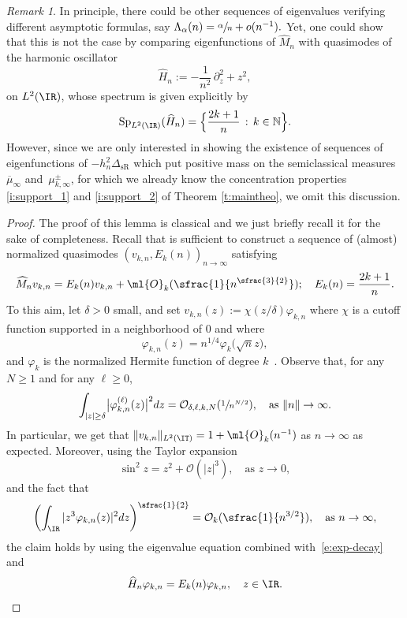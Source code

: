 \documentclass[JEP,XML,SOM,Unicode, NoEqCountersInSection,published]{cedram}
\theoremstyle{plain}
\theoremstyle{definition}
\theoremstyle{remark}
\newtheorem{rema}[theo]{Remark}
\begin{document}
\begin{rema} In principle, there could be other sequences of eigenvalues verifying different asymptotic formulas, say $\Lambda_\alpha(n)=\sfrac{\alpha}{n}+o(n^{-1}).$ Yet, one could show that this is not the case by comparing eigenfunctions of $\widehat{M}_n$ with quasimodes of the harmonic oscillator
\begin{equation}
\widehat{H}_n := - \frac{1}{ n^2}\, \partial_z^2 + z^2,
\end{equation}
on $L^2(\IR)$, whose spectrum is given explicitly by
\[
\operatorname{Sp}_{L^2(\IR)}(\widehat{H}_n) = \Bigl \{ \frac{2k+1}{n } \, : \, k \in \mathbb{N} \Bigr \}.
\]
However, since we are only interested in showing the existence of sequences of eigenfunctions of $-h_n^2 \Delta_{\operatorname{sR}}$ which put positive mass on the semiclassical measures $\overline{\mu}_\infty$ and~$\mu_{k,\infty}^\pm$, for which we already know the concentration properties \eqref{i:support_1} and \eqref{i:support_2} of Theorem \ref{t:maintheo}, we omit this discussion.
\end{rema}

\begin{proof}
The proof of this lemma is classical and we just briefly recall it for the sake of completeness. Recall that is sufficient to construct a sequence of (almost) normalized quasimodes $(v_{k,n}, E_k(n))_{n\to \infty}$ satisfying
\[
\widehat{M}_n v_{k,n} = E_k(n) v_{k,n} + \ml{O}_k(\sfrac{1}{n^{\sfrac{3}{2}}}); \quad E_k(n) = \frac{2k+1}{ n}.
\]
To this aim, let $\delta > 0$ small, and set $v_{k,n}(z) := \chi(z/\delta)\varphi_{k,n}$ where $\chi$ is a cutoff function supported in a neighborhood of $0$ and where
\[
\varphi_{k,n}(z) = n^{1/4} \varphi_k\big(\sqrt{n}z \big),
\]
and $\varphi_k$ is the normalized Hermite function of degree $k$~\cite[Th.\,6.2]{Zworski12}. Observe that, for any $N \geq 1$ and for any $\ell\geq 0$,
\begin{equation}\label{e:exp-decay}
\int_{|z|\geq \delta}\bigl|\varphi_{k,n}^{(\ell)}(z)\bigr|^2dz = \mathcal{O}_{\delta,\ell,k,N}(\sfrac{1}{ n^{N/2}}), \quad \text{as } \|n\| \to \infty.
\end{equation}
In particular, we get that $\|v_{k,n}\|_{L^2(\IT)}=1+\ml{O}_k(n^{-1})$ as $n\to\infty$ as expected. Moreover, using the Taylor expansion
\[
\sin^2z = z^2 + \mathcal{O}(\vert z \vert^3), \quad \text{as } z \to 0,
\]
and the fact that
\[
\left(\int_{\IR}|z^3\varphi_{k,n}(z)|^2 dz\right)^{\sfrac{1}{2}} = \mathcal{O}_k(\sfrac{1}{n^{3/2}}), \quad \text{as } n\to\infty,
\]
the claim holds by using the eigenvalue equation combined with~\eqref{e:exp-decay} and
\[
\widehat{H}_n \varphi_{k,n} = E_{k}(n) \varphi_{k,n}, \quad z \in \IR.\qedhere
\]
\end{proof}
\end{document}
